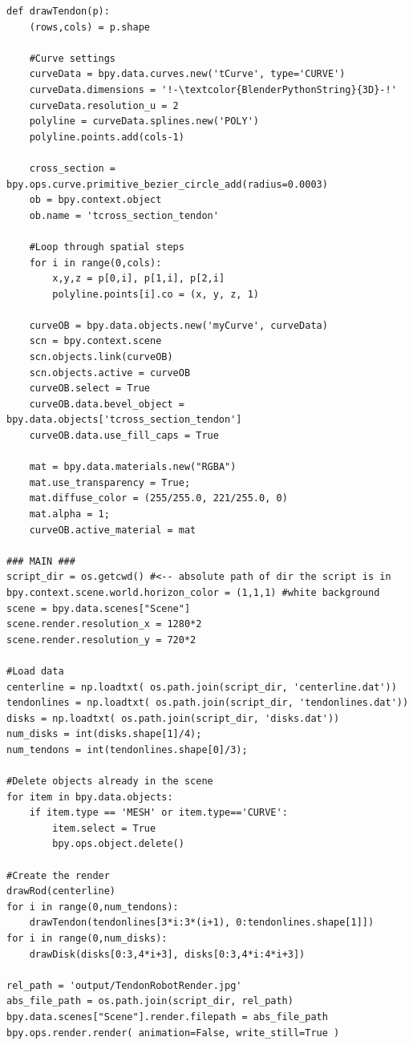 \documentclass[12pt]{article}
\begin{document}
\begin{lstlisting}
def drawTendon(p):
    (rows,cols) = p.shape

    #Curve settings
    curveData = bpy.data.curves.new('tCurve', type='CURVE')
    curveData.dimensions = '!-\textcolor{BlenderPythonString}{3D}-!'
    curveData.resolution_u = 2
    polyline = curveData.splines.new('POLY')
    polyline.points.add(cols-1)
        
    cross_section = bpy.ops.curve.primitive_bezier_circle_add(radius=0.0003)
    ob = bpy.context.object
    ob.name = 'tcross_section_tendon'

    #Loop through spatial steps
    for i in range(0,cols):
    	x,y,z = p[0,i], p[1,i], p[2,i]
    	polyline.points[i].co = (x, y, z, 1)
            
    curveOB = bpy.data.objects.new('myCurve', curveData)
    scn = bpy.context.scene
    scn.objects.link(curveOB)
    scn.objects.active = curveOB
    curveOB.select = True
    curveOB.data.bevel_object = bpy.data.objects['tcross_section_tendon']
    curveOB.data.use_fill_caps = True
    
    mat = bpy.data.materials.new("RGBA")
    mat.use_transparency = True;
    mat.diffuse_color = (255/255.0, 221/255.0, 0)
    mat.alpha = 1;
    curveOB.active_material = mat
    
### MAIN ###
script_dir = os.getcwd() #<-- absolute path of dir the script is in
bpy.context.scene.world.horizon_color = (1,1,1) #white background
scene = bpy.data.scenes["Scene"]
scene.render.resolution_x = 1280*2
scene.render.resolution_y = 720*2

#Load data
centerline = np.loadtxt( os.path.join(script_dir, 'centerline.dat'))
tendonlines = np.loadtxt( os.path.join(script_dir, 'tendonlines.dat'))
disks = np.loadtxt( os.path.join(script_dir, 'disks.dat'))
num_disks = int(disks.shape[1]/4);
num_tendons = int(tendonlines.shape[0]/3);

#Delete objects already in the scene
for item in bpy.data.objects:
    if item.type == 'MESH' or item.type=='CURVE':
        item.select = True
        bpy.ops.object.delete()

#Create the render
drawRod(centerline)
for i in range(0,num_tendons):
    drawTendon(tendonlines[3*i:3*(i+1), 0:tendonlines.shape[1]])
for i in range(0,num_disks):
    drawDisk(disks[0:3,4*i+3], disks[0:3,4*i:4*i+3])

rel_path = 'output/TendonRobotRender.jpg'
abs_file_path = os.path.join(script_dir, rel_path)
bpy.data.scenes["Scene"].render.filepath = abs_file_path
bpy.ops.render.render( animation=False, write_still=True )
\end{lstlisting}
\end{document}
